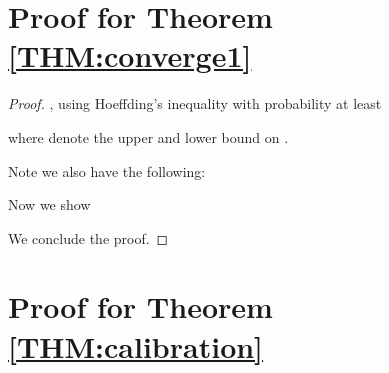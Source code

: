 \section*{Proof for Theorem \ref{THM:converge1}}
\begin{proof}

, using Hoeffding's inequality with probability at least  

where  denote the upper and lower bound on . 

Note we also have the following:

Now we show

We conclude the proof.
\end{proof}

\section*{Proof for Theorem \ref{THM:calibration}}

